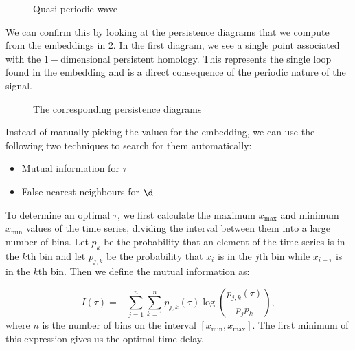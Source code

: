 \begin{figure}[h!]
    \centering
    \qquad
    \caption{Quasi-periodic wave}%
    \label{fig:nonperiodic_embedding}%
\end{figure}

We can confirm this by looking at the persistence diagrams that we compute from the embeddings in \ref{fig:embedding_diagrams}. In the first diagram, we see a single point associated with the $1-$dimensional persistent homology. This represents the single loop found in the embedding and is a direct consequence of the periodic nature of the signal.

\begin{figure}[h!]
    \centering
    \qquad
    \caption{The corresponding persistence diagrams}%
    \label{fig:embedding_diagrams}%
\end{figure}

Instead of manually picking the values for the embedding, we can use the following two techniques to search for them automatically:
\begin{itemize}
  \item Mutual information for $\tau$
  \item False nearest neighbours for $\d$
\end{itemize}

To determine an optimal $\tau$, we first calculate the maximum $x_{\text{max}}$ and minimum $x_{\text{min}}$ values of the time series, dividing the interval between them into a large number of bins. Let $p_{k}$ be the probability that an element of the time series is in the $k$th bin and let $p_{j,k}$ be the probability that $x_{i}$ is in the $j$th bin while $x_{i+\tau}$ is in the $k$th bin. Then we define the mutual information as:

\begin{equation*}
  I(\tau) = -\sum_{j=1}^{n}\sum_{k=1}^{n}p_{j,k}(\tau)\log\left(\frac{p_{j,k}(\tau)}{p_{j}p_{k}}\right),
\end{equation*}
where $n$ is the number of bins on the interval $[x_{\text{min}}, x_{\text{max}}]$. The first minimum of this expression gives us the optimal time delay.

